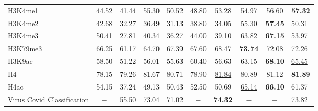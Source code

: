 \begin{table*}[t]
{\begin{tabular}{l|ccccccccb}
H3K4me1                    & 44.52    & 41.44   & 55.30          & 50.52      & 48.80       & 53.28          & 54.97          & \ul{56.60}     & \textbf{57.32}     \\
H3K4me2                    & 42.68    & 32.27   & 36.49          & 31.13      & 38.80       & 34.05          & \ul{55.30}     & \textbf{57.45} & 50.31              \\
H3K4me3                    & 50.41    & 27.81   & 40.34          & 36.27      & 44.00       & 39.10          & \ul{63.82}     & \textbf{67.15} & 53.97              \\
H3K79me3                   & 66.25    & 61.17   & 64.70          & 67.39      & 67.60       & 68.47          & \textbf{73.74} & 72.08          & \ul{72.26}         \\
H3K9ac                     & 58.50    & 51.22   & 56.01          & 55.63      & 60.40       & 56.63          & 63.15          & \textbf{68.10} & \ul{65.45}         \\
H4                         & 78.15    & 79.26   & 81.67          & 80.71      & 78.90       & \ul{81.84}     & 80.89          & 81.12          & \textbf{81.89}     \\
H4ac                       & 54.15    & 37.24   & 49.13          & 50.43      & 52.50       & 50.69          & \ul{65.14}     & \textbf{66.10} & 61.37              \\ \hline
Virus Covid Classification & $-$      & 55.50   & 73.04          & 71.02      & $-$         & \textbf{74.32} & $-$            & $-$            & \ul{73.82}         \\
% 
    \bottomrule
    \end{tabular}
    }
    \label{tab:app_gue}
    \vspace{-0.5em}
\end{table*}
